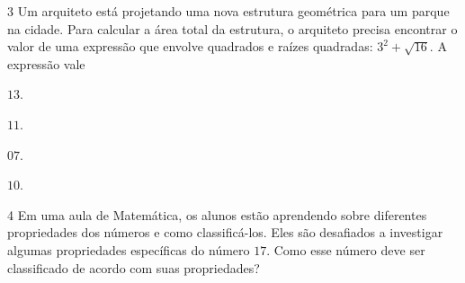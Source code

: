 
\num{3} Um arquiteto está projetando uma nova estrutura geométrica para um
parque na cidade. Para calcular a área total da estrutura, o arquiteto precisa
encontrar o valor de uma expressão que envolve quadrados e raízes quadradas:
$3^2 + \sqrt{16}$. A expressão vale

\begin{escolha}
\item $13$.

\item $11$.

\item $07$.

\item $10$.
\end{escolha}



\num{4} Em uma aula de Matemática, os alunos estão aprendendo sobre diferentes
propriedades dos números e como classificá-los. Eles são desafiados a investigar
algumas propriedades específicas do número $17$. Como esse número deve ser classificado
de acordo com suas propriedades?


